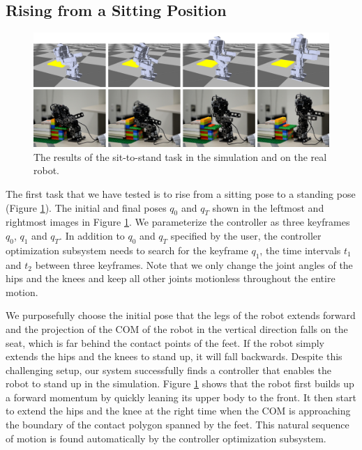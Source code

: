 \subsection{Rising from a Sitting Position}

\begin{figure}[!t]
  \centering
  \includegraphics[width=\textwidth]{figures/sit2Stand}
  \caption{The results of the sit-to-stand task in the simulation and on the real robot.}
  \label{fig:sit2Stand}
\end{figure}

The first task that we have tested is to rise from a sitting pose to a standing pose (Figure \ref{fig:sit2Stand}). The initial and final poses $q_0$ and $q_T$ shown in the leftmost and rightmost images in Figure \ref{fig:sit2Stand}. We parameterize the controller as three keyframes $q_0$, $q_1$ and $q_T$. In addition to $q_0$ and $q_T$ specified by the user, the controller optimization subsystem needs to search for the keyframe $q_1$, the time intervals $t_1$ and $t_2$ between three keyframes. Note that we only change the joint angles of the hips and the knees and keep all other joints motionless throughout the entire motion.

We purposefully choose the initial pose that the legs of the robot extends forward and the projection of the COM of the robot in the vertical direction falls on the seat, which is far behind the contact points of the feet. If the robot simply extends the hips and the knees to stand up, it will fall backwards. Despite this challenging setup, our system successfully finds a controller that enables the robot to stand up in the simulation. Figure \ref{fig:sit2Stand} shows that the robot first builds up a forward momentum by quickly leaning its upper body to the front. It then start to extend the hips and the knee at the right time when the COM is approaching the boundary of the contact polygon spanned by the feet. This natural sequence of motion is found automatically by the controller optimization subsystem.

